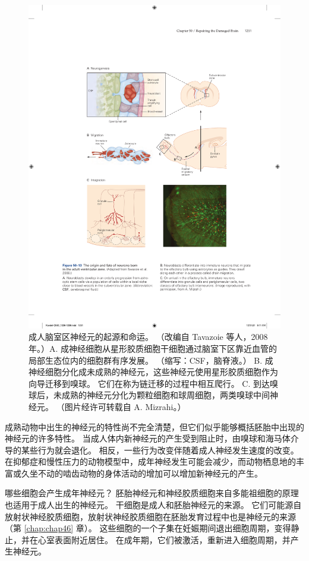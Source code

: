 \begin{figure}[htbp]
	\centering
	\includegraphics[width=0.8\linewidth]{chap50/fig_50_13}
	\caption{成人脑室区神经元的起源和命运。 （改编自 Tavazoie 等人，2008 年。）A. 成神经细胞从星形胶质细胞干细胞通过脑室下区靠近血管的局部生态位内的细胞群有序发展。 （缩写：CSF，脑脊液。） B. 成神经细胞分化成未成熟的神经元，这些神经元使用星形胶质细胞作为向导迁移到嗅球。 它们在称为链迁移的过程中相互爬行。 C. 到达嗅球后，未成熟的神经元分化为颗粒细胞和球周细胞，两类嗅球中间神经元。 （图片经许可转载自 A. Mizrahi。）}
	\label{fig:50_13}
\end{figure}


成熟动物中出生的神经元的特性尚不完全清楚，但它们似乎能够概括胚胎中出现的神经元的许多特性。 当成人体内新神经元的产生受到阻止时，由嗅球和海马体介导的某些行为就会退化。 相反，一些行为改变伴随着成人神经发生速度的改变。 在抑郁症和慢性压力的动物模型中，成年神经发生可能会减少，而动物栖息地的丰富或久坐不动的啮齿动物的身体活动的增加可以增加新神经元的产生。

哪些细胞会产生成年神经元？ 胚胎神经元和神经胶质细胞来自多能祖细胞的原理也适用于成人出生的神经元。 干细胞是成人和胚胎神经元的来源。 它们可能源自放射状神经胶质细胞，放射状神经胶质细胞在胚胎发育过程中也是神经元的来源（第 \ref{chap:chap46} 章）。 这些细胞的一个子集在妊娠期间退出细胞周期，变得静止，并在心室表面附近居住。 在成年期，它们被激活，重新进入细胞周期，并产生神经元。

